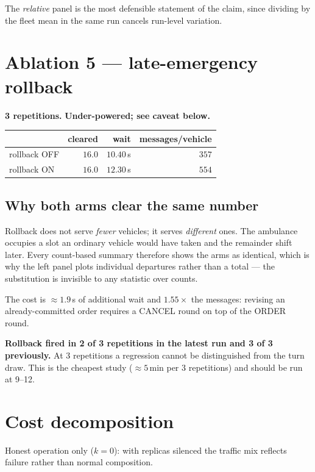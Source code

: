 \documentclass[11pt,a4paper]{article}
\newcommand{\caveat}[1]{\textcolor{red!60!black}{\textbf{#1}}}
\begin{document}
The \emph{relative} panel is the most defensible statement of the claim, since
dividing by the fleet mean in the same run cancels run-level variation.

\section{Ablation 5 --- late-emergency rollback}

\textbf{3 repetitions.} \caveat{Under-powered; see caveat below.}

\begin{center}
\begin{tabular}{lrrr}
\toprule
& cleared & wait & messages/vehicle \\
\midrule
rollback OFF & $16.0$ & $10.40$\,s & $357$ \\
rollback ON  & $16.0$ & $12.30$\,s & $554$ \\
\bottomrule
\end{tabular}
\end{center}

\subsection*{Why both arms clear the same number}

Rollback does not serve \emph{fewer} vehicles; it serves \emph{different} ones.
The ambulance occupies a slot an ordinary vehicle would have taken and the
remainder shift later. Every count-based summary therefore shows the arms as
identical, which is why the left panel plots individual departures rather than a
total --- the substitution is invisible to any statistic over counts.

The cost is ${\approx}1.9$\,s of additional wait and $1.55\times$ the messages:
revising an already-committed order requires a CANCEL round on top of the ORDER
round.

\caveat{Rollback fired in 2 of 3 repetitions in the latest run and 3 of 3
previously.} At 3 repetitions a regression cannot be distinguished from the turn
draw. This is the cheapest study (${\approx}5$\,min per 3 repetitions) and
should be run at 9--12.

\section{Cost decomposition}

Honest operation only ($k{=}0$): with replicas silenced the traffic mix reflects
failure rather than normal composition.
\end{document}
